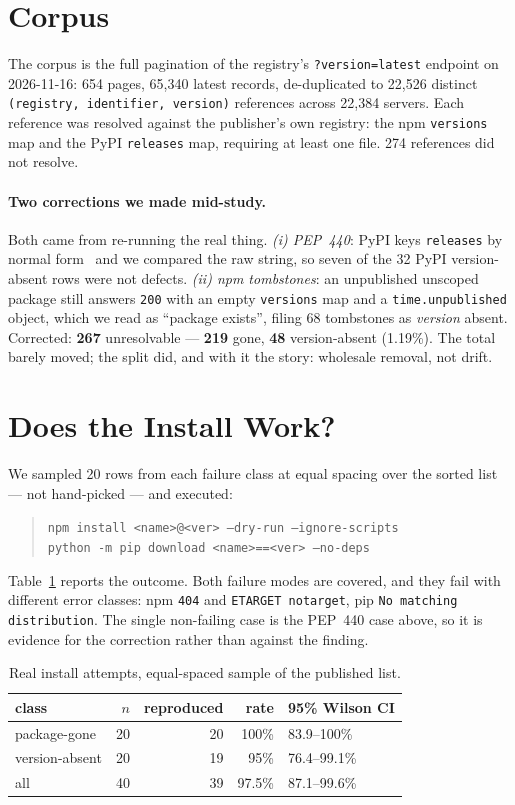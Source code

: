 \documentclass[acmsmall,screen,review,anonymous]{acmart}
\begin{document}
\section{Corpus}
The corpus is the full pagination of the registry's \texttt{?version=latest} endpoint on
2026-11-16: 654 pages, 65{,}340 latest records, de-duplicated to 22{,}526 distinct
\texttt{(registry, identifier, version)} references across 22{,}384 servers. Each reference
was resolved against the publisher's own registry: the npm \texttt{versions} map and the
PyPI \texttt{releases} map, requiring at least one file. 274 references did not resolve.

\paragraph{Two corrections we made mid-study.} Both came from re-running the real thing.
\emph{(i) PEP~440}: PyPI keys \texttt{releases} by normal form~\cite{pep440} and we compared
the raw string, so seven of the 32 PyPI version-absent rows were not defects.
\emph{(ii) npm tombstones}: an unpublished unscoped package still answers \texttt{200} with
an empty \texttt{versions} map and a \texttt{time.unpublished} object, which we read as
``package exists'', filing 68 tombstones as \emph{version} absent. Corrected:
\textbf{267} unresolvable --- \textbf{219} gone, \textbf{48} version-absent (1.19\%). The
total barely moved; the split did, and with it the story: wholesale removal, not drift.

\section{Does the Install Work?}
We sampled 20 rows from each failure class at equal spacing over the sorted list --- not
hand-picked --- and executed:
\begin{quote}\small
\texttt{npm install <name>@<ver> --dry-run --ignore-scripts}\\
\texttt{python -m pip download <name>==<ver> --no-deps}
\end{quote}
Table~\ref{tab:repro} reports the outcome. Both failure modes are covered, and they fail
with different error classes: npm \texttt{404} and \texttt{ETARGET notarget}, pip
\texttt{No matching distribution}. The single non-failing case is the PEP~440 case above,
so it is evidence for the correction rather than against the finding.

\begin{table}[t]
\caption{Real install attempts, equal-spaced sample of the published list.}
\label{tab:repro}
\small
\begin{tabular}{@{}lrrrl@{}}
\toprule
class & $n$ & reproduced & rate & 95\% Wilson CI\\
\midrule
package-gone & 20 & 20 & 100\% & 83.9--100\%\\
version-absent & 20 & 19 & 95\% & 76.4--99.1\%\\
\midrule
all & 40 & 39 & 97.5\% & 87.1--99.6\%\\
\bottomrule
\end{tabular}
\end{table}
\end{document}
